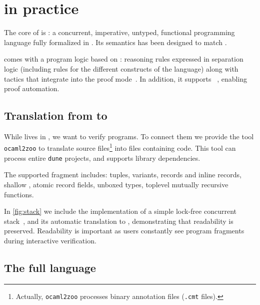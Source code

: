 \section{\Zoo in practice}
\label{sec:zoo}


The core of \Zoo is \ZooLang: a concurrent, imperative, untyped, functional programming language fully formalized in \Rocq. Its semantics has been designed to match \OCaml.

\ZooLang comes with a program logic based on \Iris: reasoning rules expressed in separation logic (including rules for the different constructs of the language) along with \Rocq tactics that integrate into the \Iris proof mode~\cite{%
  DBLP:journals/pacmpl/KrebbersJ0TKTCD18}.
In addition, it supports \Diaframe~\cite{DBLP:conf/pldi/MulderKG22%
}, enabling proof automation.

\subsection{Translation from \OCaml to \ZooLang}



While \ZooLang lives in \Rocq, we want to verify \OCaml programs.
To connect them we provide the tool \texttt{ocaml2zoo} to translate \OCaml source files\footnote{Actually, \texttt{ocaml2zoo} processes binary annotation files (\texttt{.cmt} files).} into \Rocq files containing \ZooLang code.
This tool can process entire \texttt{dune} projects, and supports library dependencies.

The supported \OCaml fragment includes: tuples, variants, records and inline records, shallow , atomic record fields, unboxed types, toplevel mutually recursive functions.

In \cref{fig:stack} we include the \OCaml implementation of a simple lock-free concurrent stack~\cite{thomas1986systems}, and its automatic translation to \ZooLang, demonstrating that readability is preserved. Readability is important as users constantly see program fragments during interactive verification.

\subsection{The full language}

